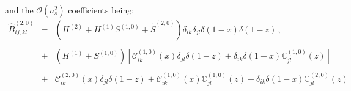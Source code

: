 \documentclass[10pt,a4paper]{article}
\begin{document}
and the $\mathcal{O}(a_s^2)$ coefficients being:
\begin{equation}
\begin{array}{rcl}
  \hat{B}_{ij,kl}^{(2,0)} &=&\displaystyle (H^{(2)}+H^{(1)}S^{(1,0)}+\widetilde{S}^{(2,0)})
                              \delta_{ik}\delta_{jl}\delta(1-x)\delta(1-z) \,,\\
  \\
                          &+&\displaystyle
                              (H^{(1)}+S^{(1,0)})\left[\mathcal{C}_{ik}^{(1,0)}(x)\delta_{jl}\delta(1-z)
                              +
                              \delta_{ik}\delta(1-x)\mathbb{C}_{jl}^{(1,0)}(z)\right]\\
  \\
                          &+&\displaystyle \mathcal{C}_{ik}^{(2,0)}(x)\delta_{jl}\delta(1-z) + 
                              \mathcal{C}_{ik}^{(1,0)}(x)\mathbb{C}_{jl}^{(1,0)}(z)
                              +\delta_{ik}\delta(1-x)\mathbb{C}_{jl}^{(2,0)}(z)\\


\end{array}
\end{equation}
\end{document}
